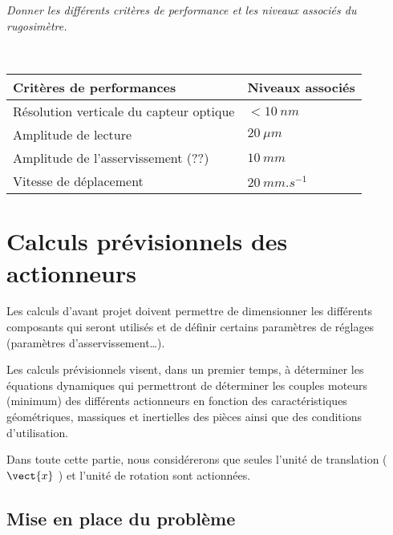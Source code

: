 \subparagraph{\label{q_01}}\textit{Donner les différents critères de performance et les niveaux associés du rugosimètre.}
\ifprof
\begin{corrige} ~\\

\begin{center}
\begin{tabular}{ll}
\hline
Critères de performances & Niveaux associés \\ \hline \hline
Résolution verticale du capteur optique & $< \SI{10}{nm}$ \\ \hline
Amplitude de lecture & $\SI{20}{\mu m}$ \\ \hline
Amplitude de l'asservissement (??) & $\SI{10}{mm}$ \\ \hline
Vitesse de déplacement & $\SI{20}{mm.s^{-1}}$\\ \hline
\end{tabular}
\end{center}
\end{corrige}
\else
\fi


\section{Calculs prévisionnels des actionneurs \label{sec:3}}

\ifprof
\else
Les calculs d’avant projet doivent permettre de dimensionner les différents composants qui seront utilisés
et de définir certains paramètres de réglages (paramètres d’asservissement…).

Les calculs prévisionnels visent, dans un premier temps, à déterminer les équations dynamiques qui
permettront de déterminer les couples moteurs (minimum) des différents actionneurs en fonction des
caractéristiques géométriques, massiques et inertielles des pièces ainsi que des conditions d’utilisation.

Dans toute cette partie, nous considérerons que seules l'unité de translation ($\vect{x}$ ) et l’unité de rotation sont
actionnées.
\fi

\subsection{Mise en place du problème}

